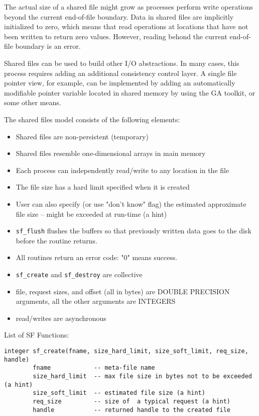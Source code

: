 The actual size of a shared file might grow as processes perform write operations
beyond the current end-of-file boundary.  Data in shared files are implicitly initialized 
to zero, which means that read operations at locations that have not been written to
return zero values.  However, reading behond the current end-of-file boundary is an
error.

Shared files can be used to build other I/O abstractions.  In many cases, this process
requires adding an additional consistency control layer.  A single file pointer view,
for example, can be implemented by adding an automatically modifiable pointer 
variable located in shared memory by using the GA toolkit, or some other means.

The shared files model consists of the following elements:

\begin{itemize}
\item  Shared files are non-persistent (temporary)
\item  Shared files resemble one-dimensional arrays in main memory
\item  Each process can independently read/write to any location in the file
\item  The file size has a hard limit specified when it is created
\item  User can also specify (or use "don't know" flag) the estimated approximate
  file size -- might be exceeded at run-time (a hint)
\item  {\tt sf\_flush} flushes the buffers so that previously written data goes to the disk
  before the routine returns.
\item  All routines return an error code: "0" means success.
\item  {\tt sf\_create} and {\tt sf\_destroy} are collective
\item  file, request sizes, and offset (all in bytes) are DOUBLE PRECISION arguments,
  all the other arguments are INTEGERS
\item  read/writes are asynchronous
\end{itemize}


List of SF Functions:

\begin{verbatim}
integer sf_create(fname, size_hard_limit, size_soft_limit, req_size, handle)
        fname            -- meta-file name
        size_hard_limit  -- max file size in bytes not to be exceeded (a hint)
        size_soft_limit  -- estimated file size (a hint)
        req_size         -- size of  a typical request (a hint)
        handle           -- returned handle to the created file
\end{verbatim}

